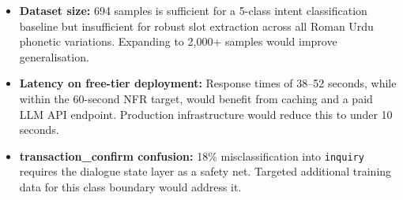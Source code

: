 \begin{itemize}
  \item \textbf{Dataset size:} 694 samples is sufficient for a 5-class intent
        classification baseline but insufficient for robust slot extraction across all
        Roman Urdu phonetic variations.  Expanding to 2,000+ samples would improve
        generalisation.

  \item \textbf{Latency on free-tier deployment:} Response times of 38--52 seconds,
        while within the 60-second NFR target, would benefit from caching and a paid
        LLM API endpoint.  Production infrastructure would reduce this to under 10
        seconds.

  \item \textbf{transaction\_confirm confusion:} 18\% misclassification into
        \texttt{inquiry} requires the dialogue state layer as a safety net.  Targeted
        additional training data for this class boundary would address it.

\end{itemize}

